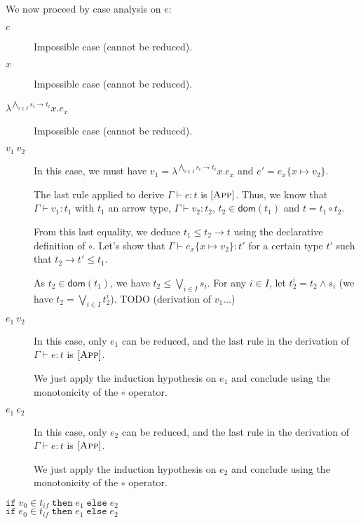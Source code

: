 \documentclass[a4paper]{article}%
\newcommand{\apply}[2]{#1\circ#2}
\newcommand{\dom}[1]{\textsf{dom}(#1)}
\newcommand{\ite}[4]{\ensuremath{\texttt{if}\;#1\in#2\;\texttt{then}\;#3\;\texttt{else}\;#4}}
\newcommand{\subst}[2]{\{#1 \mapsto #2\}}
\theoremstyle{definition}
\newcommand {\Rule}[1] {[\textsc{#1}]}
\begin{document}
    We now proceed by case analysis on $e$:

    \begin{description}
      \item[$c$] Impossible case (cannot be reduced).
      \item[$x$] Impossible case (cannot be reduced).
      \item[$\lambda^{\bigwedge_{i\in I} s_i \rightarrow t_i}x.e_x$] Impossible case (cannot be reduced).
      \item[$v_1\ v_2$] In this case, we must have $v_1=\lambda^{\bigwedge_{i\in I} s_i \rightarrow t_i}x.e_x$ and $e'=e_x\subst x {v_2}$.

      The last rule applied to derive $\Gamma \vdash e:t$ is $\Rule{App}$.
      Thus, we know that $\Gamma \vdash v_1 : t_1$ with $t_1$ an arrow type, $\Gamma \vdash v_2 : t_2$, $t_2 \in \dom {t_1}$ and $t=\apply {t_1} {t_2}$.

      From this last equality, we deduce $t_1 \leq t_2 \rightarrow t$ using the declarative definition of $\circ$.
      Let's show that $\Gamma \vdash e_x\subst x {v_2}:t'$ for a certain type $t'$ such that $t_2 \rightarrow t' \leq t_1$.
      
      As $t_2 \in \dom {t_1}$, we have $t_2 \leq \bigvee_{i\in I} s_i$. For any $i\in I$, let $t_2^i=t_2 \land s_i$ (we have $t_2=\bigvee_{i\in I}t_2^i$).
      TODO (derivation of $v_1$...)

      \item[$e_1\ v_2$] In this case, only $e_1$ can be reduced, and the last rule in the derivation of $\Gamma \vdash e:t$ is $\Rule{App}$.

      We just apply the induction hypothesis on $e_1$ and conclude using the monotonicity of the $\circ$ operator.
      \item[$e_1\ e_2$] In this case, only $e_2$ can be reduced, and the last rule in the derivation of $\Gamma \vdash e:t$ is $\Rule{App}$.

      We just apply the induction hypothesis on $e_2$ and conclude using the monotonicity of the $\circ$ operator.
      \item[$\ite {v_0} {t_{if}} {e_1} {e_2}$] 
      \item[$\ite {e_0} {t_{if}} {e_1} {e_2}$]
    \end{description}
\end{document}
